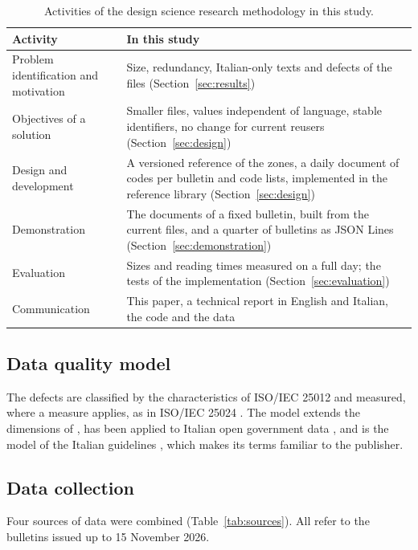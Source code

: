 \documentclass[review,authoryear,12pt]{elsarticle}
\newcommand{\library}{the reference library}
\newcommand{\library}{\texttt{aiodpc}}
\begin{document}
\begin{table}[t]
\centering
\caption{Activities of the design science research methodology
\citep{peffers2007} in this study.}
\label{tab:dsr}
\small
\begin{tabularx}{\linewidth}{@{}lX@{}}
\toprule
Activity & In this study \\
\midrule
Problem identification and motivation & Size, redundancy, Italian-only
texts and defects of the files (Section~\ref{sec:results}) \\
Objectives of a solution & Smaller files, values independent of language,
stable identifiers, no change for current reusers
(Section~\ref{sec:design}) \\
Design and development & A versioned reference of the zones, a daily document
of codes per bulletin and code lists, implemented in \library{}
(Section~\ref{sec:design}) \\
Demonstration & The documents of a fixed bulletin, built from the current
files, and a quarter of bulletins as JSON Lines
(Section~\ref{sec:demonstration}) \\
Evaluation & Sizes and reading times measured on a full day; the tests of the
implementation (Section~\ref{sec:evaluation}) \\
Communication & This paper, a technical report in English and Italian, the
code and the data \\
\bottomrule
\end{tabularx}
\end{table}

\subsection{Data quality model}

The defects are classified by the characteristics of ISO/IEC 25012
\citep{iso25012} and measured, where a measure applies, as in ISO/IEC 25024
\citep{iso25024}. The model extends the dimensions of \citet{wang1996}, has been
applied to Italian open government data \citep{vetro2016}, and is the model
of the Italian guidelines \citep{agid2023}, which makes its terms familiar to
the publisher.

\subsection{Data collection}
\label{sec:data}

Four sources of data were combined (Table~\ref{tab:sources}). All refer to the
bulletins issued up to 15 November 2026.
\end{document}
